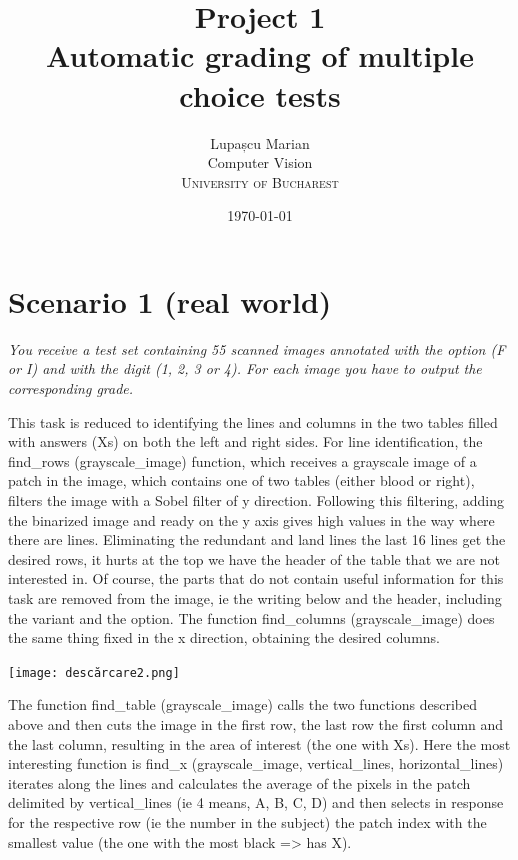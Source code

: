 \documentclass[12pt]{article}
\title{Project 1 \\
Automatic grading of multiple choice tests} %
\author{Lupașcu Marian\\ %
Computer Vision\\ %
\textsc{University of Bucharest}
}
\date{\today} %
\begin{document}
\setlength{\droptitle}{-5em}    

\maketitle



\section*{Scenario 1 (real world)}

\emph{You receive a test set containing 55 scanned images annotated with the option (F or I) 
and with the digit (1, 2, 3 or 4). For each image you have to output the corresponding grade.}

This task is reduced to identifying the lines and columns in the two tables filled with answers (Xs)
on both the left and right sides. For line identification, the find\_rows (grayscale\_image) 
function, which receives a grayscale image of a patch in the image, which contains one of two 
tables (either blood or right), filters the image with a Sobel filter of y direction. Following 
this filtering, adding the binarized image and ready on the y axis gives high values ​​in the way 
where there are lines. Eliminating the redundant and land lines the last 16 lines get the desired 
rows, it hurts at the top we have the header of the table that we are not interested in. Of course, 
the parts that do not contain useful information for this task are removed from the image, ie the 
writing below and the header, including the variant and the option. The function 
find\_columns (grayscale\_image) does the same thing fixed in the x direction, obtaining the desired columns.
\par

\texttt{[image: descărcare2.png]}

The function find\_table (grayscale\_image) calls the two functions described above and then cuts the image 
in the first row, the last row the first column and the last column, resulting in the area of ​​interest 
(the one with Xs). Here the most interesting function is find\_x (grayscale\_image, vertical\_lines, 
horizontal\_lines) iterates along the lines and calculates the average of the pixels in the patch 
delimited by vertical\_lines (ie 4 means, A, B, C, D) and then selects in response for the respective 
row (ie the number in the subject) the patch index with the smallest value (the one with the most 
black => has X).
\par
\end{document}
